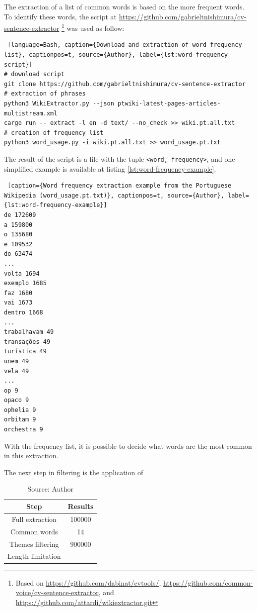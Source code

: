The extraction of a list of common words is based on the more frequent words. To identify these words, the script at \url{https://github.com/gabrieltnishimura/cv-sentence-extractor} \footnote{Based on \url{https://github.com/dabinat/cvtools/}, \url{https://github.com/common-voice/cv-sentence-extractor}, and \url{https://github.com/attardi/wikiextractor.git}} was used as follow:

\begin{lstlisting} [language=Bash, caption={Download and extraction of word frequency list}, captionpos=t, source={Author}, label={lst:word-frequency-script}]
# download script
git clone https://github.com/gabrieltnishimura/cv-sentence-extractor
# extraction of phrases
python3 WikiExtractor.py --json ptwiki-latest-pages-articles-multistream.xml
cargo run -- extract -l en -d text/ --no_check >> wiki.pt.all.txt
# creation of frequency list
python3 word_usage.py -i wiki.pt.all.txt >> word_usage.pt.txt
\end{lstlisting}

The result of the script is a file with the tuple \texttt{<word, frequency>}, and one simplified example is available at listing \ref{lst:word-frequency-example}.

\begin{lstlisting} [caption={Word frequency extraction example from the Portuguese Wikipedia (word_usage.pt.txt)}, captionpos=t, source={Author}, label={lst:word-frequency-example}]
de 172609
a 159800
o 135680
e 109532
do 63474
...
volta 1694
exemplo 1685
faz 1680
vai 1673
dentro 1668
...
trabalhavam 49
transações 49
turística 49
unem 49
vela 49
...
op 9
opaco 9
ophelia 9
orbitam 9
orchestra 9
\end{lstlisting}

With the frequency list, it is possible to decide what words are the most common in this extraction.

The next step in filtering is the application of 

\begin{table}[h]
    \centering
    \caption{Phrases Filtering Results of the Portuguese Wikipedia (extracted 01/20/2021)}
    \label{tab:filtering}
    \begin{tabular}{|c|c|}
        \hline Step & Results \\ \hline
        Full extraction & 100000 \\ \hline
        Common words & 14 \\ \hline
        Themes filtering & 900000 \\ \hline
        Length limitation &  \\ \hline
    \end{tabular}
    \caption*{Source: Author}
\end{table}

